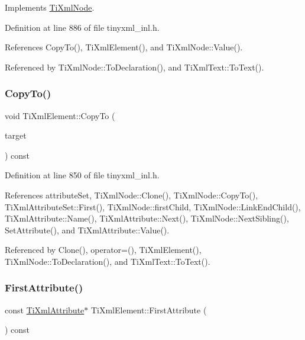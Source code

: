 Implements \hyperlink{class_ti_xml_node_a4508cc3a2d7a98e96a54cc09c37a78a4}{Ti\+Xml\+Node}.



Definition at line 886 of file tinyxml\+\_\+inl.\+h.



References Copy\+To(), Ti\+Xml\+Element(), and Ti\+Xml\+Node\+::\+Value().



Referenced by Ti\+Xml\+Node\+::\+To\+Declaration(), and Ti\+Xml\+Text\+::\+To\+Text().

\hypertarget{class_ti_xml_element_ab931f2208ed76ba03465d8a1f86b5935}{}\label{class_ti_xml_element_ab931f2208ed76ba03465d8a1f86b5935} 
\subsubsection{\texorpdfstring{Copy\+To()}{CopyTo()}}
{\footnotesize\ttfamily void Ti\+Xml\+Element\+::\+Copy\+To (\begin{DoxyParamCaption}\item[{\hyperlink{class_ti_xml_element}{Ti\+Xml\+Element} $\ast$}]{target }\end{DoxyParamCaption}) const\hspace{0.3cm}{\ttfamily [protected]}}



Definition at line 850 of file tinyxml\+\_\+inl.\+h.



References attribute\+Set, Ti\+Xml\+Node\+::\+Clone(), Ti\+Xml\+Node\+::\+Copy\+To(), Ti\+Xml\+Attribute\+Set\+::\+First(), Ti\+Xml\+Node\+::first\+Child, Ti\+Xml\+Node\+::\+Link\+End\+Child(), Ti\+Xml\+Attribute\+::\+Name(), Ti\+Xml\+Attribute\+::\+Next(), Ti\+Xml\+Node\+::\+Next\+Sibling(), Set\+Attribute(), and Ti\+Xml\+Attribute\+::\+Value().



Referenced by Clone(), operator=(), Ti\+Xml\+Element(), Ti\+Xml\+Node\+::\+To\+Declaration(), and Ti\+Xml\+Text\+::\+To\+Text().

\hypertarget{class_ti_xml_element_a003131b1bbf0b8054b11571c1b9a4d3a}{}\label{class_ti_xml_element_a003131b1bbf0b8054b11571c1b9a4d3a} 
\subsubsection{\texorpdfstring{First\+Attribute()}{FirstAttribute()}\hspace{0.1cm}{\footnotesize\ttfamily [1/2]}}
{\footnotesize\ttfamily const \hyperlink{class_ti_xml_attribute}{Ti\+Xml\+Attribute}$\ast$ Ti\+Xml\+Element\+::\+First\+Attribute (\begin{DoxyParamCaption}{ }\end{DoxyParamCaption}) const\hspace{0.3cm}{\ttfamily [inline]}}



